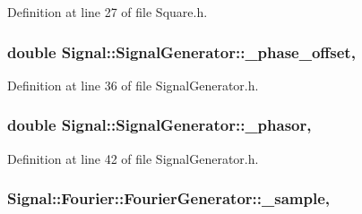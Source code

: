 Definition at line 27 of file Square.\+h.

\hypertarget{classSignal_1_1SignalGenerator_a6b4444d46747c8517171edbbf4b5588f}{
\subsubsection[{\+\_\+phase\+\_\+offset}]{\setlength{\rightskip}{0pt plus 5cm}double Signal\+::\+Signal\+Generator\+::\+\_\+phase\+\_\+offset\hspace{0.3cm}{\ttfamily [protected]}, {\ttfamily [inherited]}}}\label{classSignal_1_1SignalGenerator_a6b4444d46747c8517171edbbf4b5588f}


Definition at line 36 of file Signal\+Generator.\+h.

\hypertarget{classSignal_1_1SignalGenerator_af4aa0728ded00777be26a06d883eaeb3}{
\subsubsection[{\+\_\+phasor}]{\setlength{\rightskip}{0pt plus 5cm}double Signal\+::\+Signal\+Generator\+::\+\_\+phasor\hspace{0.3cm}{\ttfamily [protected]}, {\ttfamily [inherited]}}}\label{classSignal_1_1SignalGenerator_af4aa0728ded00777be26a06d883eaeb3}


Definition at line 42 of file Signal\+Generator.\+h.

\hypertarget{classSignal_1_1Fourier_1_1FourierGenerator_ad720bf2b268dc621ace64c54c0816597}{
\subsubsection[{\+\_\+sample}]{ Signal\+::\+Fourier\+::\+Fourier\+Generator\+::\+\_\+sample\hspace{0.3cm}{\ttfamily [protected]}, {\ttfamily [inherited]}}}\label{classSignal_1_1Fourier_1_1FourierGenerator_ad720bf2b268dc621ace64c54c0816597}


